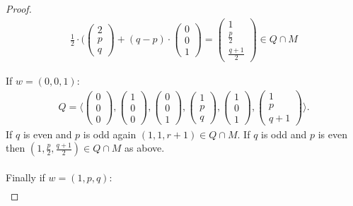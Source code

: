 \documentclass[12pt, english]{article}
\begin{document}
\begin{proof}
\begin{align*}
		\frac{1}{2} \cdot \Big( \begin{pmatrix}
			2\\p\\q
		\end{pmatrix} + (q-p) \cdot \begin{pmatrix}
			0\\0\\1
		\end{pmatrix} = \begin{pmatrix}
			1\\ \frac{p}{2} \\ \frac{q+1}{2}
		\end{pmatrix} \in Q \cap M
	\end{align*} 
	
	If $w=(0,0,1)$:
	\begin{align*}
		Q = \langle \begin{pmatrix} 0\\0\\0 \end{pmatrix}, \begin{pmatrix} 1\\0\\0 \end{pmatrix}, \begin{pmatrix} 0\\0\\1 \end{pmatrix}, \begin{pmatrix} 1\\p\\q \end{pmatrix}, \begin{pmatrix} 1\\0\\1 \end{pmatrix}, \begin{pmatrix} 1\\p\\q+1 \end{pmatrix} \rangle.
	\end{align*}
	If $q$ is even and $p$ is odd again $(1,1,r+1) \in Q \cap M$. If $q$ is odd and $p$ is even then $(1,\frac{p}{2}, \frac{q+1}{2}) \in Q \cap M$ as above. \leavevmode \\ \\
	Finally if $w=(1,p,q)$:
	\begin{align*}

\end{align*}
\end{proof}
\end{document}
